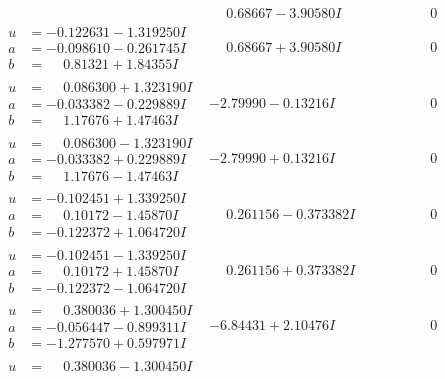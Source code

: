 \documentclass[1p]{elsarticle_modified}
\theoremstyle{definition}
\begin{document}
$$\begin{array}{c|c|c}
 & \phantom{-}0.68667 - 3.90580 I & \phantom{-0.000000 } 0 \\ \hline\begin{aligned}
u &= -0.122631 - 1.319250 I \\
a &= -0.098610 - 0.261745 I \\
b &= \phantom{-}0.81321 + 1.84355 I\end{aligned}
 & \phantom{-}0.68667 + 3.90580 I & \phantom{-0.000000 } 0 \\ \hline\begin{aligned}
u &= \phantom{-}0.086300 + 1.323190 I \\
a &= -0.033382 - 0.229889 I \\
b &= \phantom{-}1.17676 + 1.47463 I\end{aligned}
 & -2.79990 - 0.13216 I & \phantom{-0.000000 } 0 \\ \hline\begin{aligned}
u &= \phantom{-}0.086300 - 1.323190 I \\
a &= -0.033382 + 0.229889 I \\
b &= \phantom{-}1.17676 - 1.47463 I\end{aligned}
 & -2.79990 + 0.13216 I & \phantom{-0.000000 } 0 \\ \hline\begin{aligned}
u &= -0.102451 + 1.339250 I \\
a &= \phantom{-}0.10172 - 1.45870 I \\
b &= -0.122372 + 1.064720 I\end{aligned}
 & \phantom{-}0.261156 - 0.373382 I & \phantom{-0.000000 } 0 \\ \hline\begin{aligned}
u &= -0.102451 - 1.339250 I \\
a &= \phantom{-}0.10172 + 1.45870 I \\
b &= -0.122372 - 1.064720 I\end{aligned}
 & \phantom{-}0.261156 + 0.373382 I & \phantom{-0.000000 } 0 \\ \hline\begin{aligned}
u &= \phantom{-}0.380036 + 1.300450 I \\
a &= -0.056447 - 0.899311 I \\
b &= -1.277570 + 0.597971 I\end{aligned}
 & -6.84431 + 2.10476 I & \phantom{-0.000000 } 0 \\ \hline\begin{aligned}
u &= \phantom{-}0.380036 - 1.300450 I \\

\end{aligned}
\end{array}$$
\end{document}
